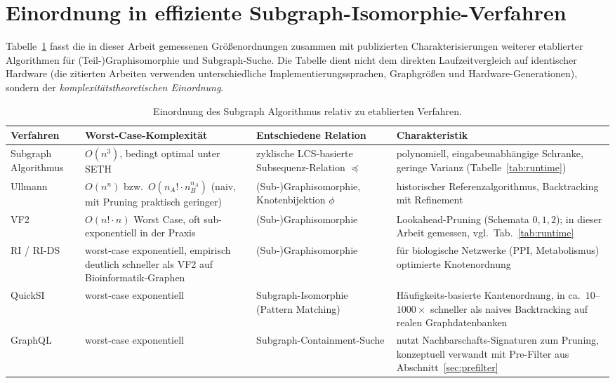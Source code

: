 \documentclass[a4paper,12pt, twoside]{report}
\theoremstyle{definition}
\begin{document}
\section{Einordnung in effiziente Subgraph-Isomorphie-Verfahren}
\label{sec:literatur_cmp}

Tabelle~\ref{tab:literatur} fasst die in dieser Arbeit gemessenen Größenordnungen zusammen mit publizierten Charakterisierungen weiterer etablierter Algorithmen für (Teil-)Graphisomorphie und Subgraph-Suche. Die Tabelle dient nicht dem direkten Laufzeitvergleich auf identischer Hardware (die zitierten Arbeiten verwenden unterschiedliche Implementierungssprachen, Graphgrößen und Hardware-Generationen), sondern der \emph{komplexitätstheoretischen Einordnung}.

\begin{table}
	\small
	\centering
	\setlength{\tabcolsep}{3pt}
	\caption{Einordnung des Subgraph Algorithmus relativ zu etablierten Verfahren.}
	\begin{tabular}{>{\raggedright\arraybackslash}p{4.2cm}>{\raggedright\arraybackslash}p{4.8cm}>{\raggedright\arraybackslash}p{4.2cm}>{\raggedright\arraybackslash}p{6.4cm}}
		\toprule
		Verfahren & Worst-Case-Komplexität & Entschiedene Relation & Charakteristik \\
		\midrule
		Subgraph Algorithmus \cite{epp2026subgraph} & $O(n^3)$, bedingt optimal unter SETH \cite{abboud2015} & zyklische LCS-basierte Subsequenz-Relation $\preceq$ & polynomiell, eingabeunabhängige Schranke, geringe Varianz (Tabelle~\ref{tab:runtime}) \\
		Ullmann \cite{ullmann1976} & $O(n^{n})$ bzw.\ $O(n_A!\cdot n_B^{n_A})$ (naiv, mit Pruning praktisch geringer) & (Sub-)Graphisomorphie, Knotenbijektion $\phi$ & historischer Referenzalgorithmus, Backtracking mit Refinement \\
		VF2 \cite{cordella2004} & $O(n!\cdot n)$ Worst Case, oft sub-exponentiell in der Praxis & (Sub-)Graphisomorphie & Look\-ahead-Pruning (Schemata $0,1,2$); in dieser Arbeit gemessen, vgl.\ Tab.~\ref{tab:runtime} \\
		RI / RI-DS \cite{bonnici2013} & worst-case exponentiell, empirisch deutlich schneller als VF2 auf Bioinformatik-Graphen & (Sub-)Graphisomorphie & für biologische Netzwerke (PPI, Metabolismus) optimierte Knotenordnung \\
		QuickSI \cite{he2008} & worst-case exponentiell & Subgraph-Isomorphie (Pattern Matching) & Häufigkeits-basierte Kantenordnung, in \cite{he2008} ca.\ $10$--$1000\times$ schneller als naives Backtracking auf realen Graphdatenbanken \\
		GraphQL \cite{he2008} & worst-case exponentiell & Subgraph-Containment-Suche & nutzt Nachbarschafts-Signaturen zum Pruning, konzeptuell verwandt mit Pre-Filter aus Abschnitt~\ref{sec:prefilter} \\
		\bottomrule
	\end{tabular}
	\label{tab:literatur}
\end{table}
\end{document}
